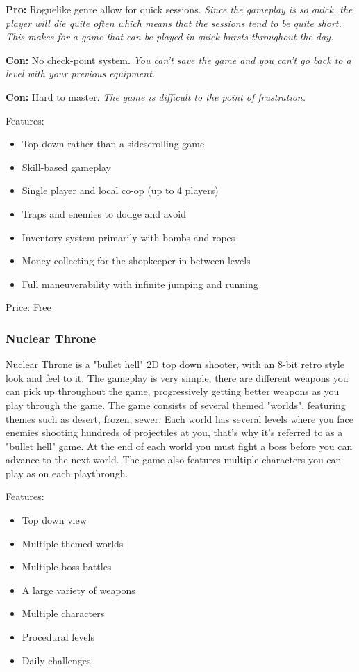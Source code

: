 \documentclass[12p]{article}
\begin{document}
\textbf{Pro:} Roguelike genre allow for quick sessions. \emph{Since the gameplay is so quick, the player will die quite often which means that the sessions tend to be quite short. This makes for a game that can be played in quick bursts throughout the day.}

\textbf{Con:} No check-point system. \emph{You can't save the game and you can't go back to a level with your previous equipment.}

\textbf{Con:} Hard to master. \emph{The game is difficult to the point of frustration.}

Features:

\begin{itemize}
  \item Top-down rather than a sidescrolling game
  \item Skill-based gameplay
  \item Single player and local co-op (up to 4 players)
  \item Traps and enemies to dodge and avoid
  \item Inventory system primarily with bombs and ropes
  \item Money collecting for the shopkeeper in-between levels
  \item Full maneuverability with infinite jumping and running
\end{itemize}

Price: Free


\subsubsection{Nuclear Throne}

Nuclear Throne is a "bullet hell" 2D top down shooter, with an 8-bit retro style look and feel to it. The gameplay is very simple, there are different weapons you can pick up throughout the game, progressively getting better weapons as you play through the game. The game consists of several themed "worlds", featuring themes such as desert, frozen, sewer. Each world has several levels where you face enemies shooting hundreds of projectiles at you, that's why it's referred to as a "bullet hell" game. At the end of each world you must fight a boss before you can advance to the next world. The game also features multiple characters you can play as on each playthrough.

Features:

\begin{itemize}
  \item Top down view
  \item Multiple themed worlds
  \item Multiple boss battles
  \item A large variety of weapons
  \item Multiple characters
  \item Procedural levels
  \item Daily challenges
\end{itemize}
\end{document}

